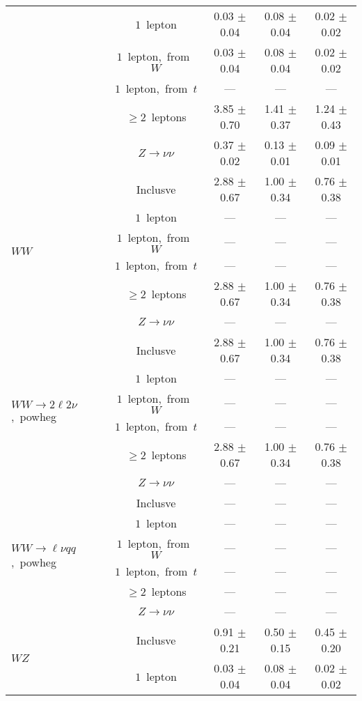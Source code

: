 \documentclass{article}
\begin{document}
\begin{longtable}{|l|c|c|c|c|}
 & $1$~lepton  & 0.03 $\pm$ 0.04  & 0.08 $\pm$ 0.04  & 0.02 $\pm$ 0.02 \\* 
 & $1$~lepton,~from~$W$  & 0.03 $\pm$ 0.04  & 0.08 $\pm$ 0.04  & 0.02 $\pm$ 0.02 \\* 
 & $1$~lepton,~from~$t$  & ---  & ---  & --- \\* 
 & $\ge2$~leptons  & 3.85 $\pm$ 0.70  & 1.41 $\pm$ 0.37  & 1.24 $\pm$ 0.43 \\* 
 & $Z\rightarrow\nu\nu$  & 0.37 $\pm$ 0.02  & 0.13 $\pm$ 0.01  & 0.09 $\pm$ 0.01 \\* 
\hline 
\multirow{6}{*}{$WW$} & Inclusve  & 2.88 $\pm$ 0.67  & 1.00 $\pm$ 0.34  & 0.76 $\pm$ 0.38 \\* 
 & $1$~lepton  & ---  & ---  & --- \\* 
 & $1$~lepton,~from~$W$  & ---  & ---  & --- \\* 
 & $1$~lepton,~from~$t$  & ---  & ---  & --- \\* 
 & $\ge2$~leptons  & 2.88 $\pm$ 0.67  & 1.00 $\pm$ 0.34  & 0.76 $\pm$ 0.38 \\* 
 & $Z\rightarrow\nu\nu$  & ---  & ---  & --- \\* 
\hline 
\multirow{6}{*}{$WW{\rightarrow}2\ell2\nu$,~powheg} & Inclusve  & 2.88 $\pm$ 0.67  & 1.00 $\pm$ 0.34  & 0.76 $\pm$ 0.38 \\* 
 & $1$~lepton  & ---  & ---  & --- \\* 
 & $1$~lepton,~from~$W$  & ---  & ---  & --- \\* 
 & $1$~lepton,~from~$t$  & ---  & ---  & --- \\* 
 & $\ge2$~leptons  & 2.88 $\pm$ 0.67  & 1.00 $\pm$ 0.34  & 0.76 $\pm$ 0.38 \\* 
 & $Z\rightarrow\nu\nu$  & ---  & ---  & --- \\* 
\hline 
\multirow{6}{*}{$WW{\rightarrow}{\ell}{\nu}qq$,~powheg} & Inclusve  & ---  & ---  & --- \\* 
 & $1$~lepton  & ---  & ---  & --- \\* 
 & $1$~lepton,~from~$W$  & ---  & ---  & --- \\* 
 & $1$~lepton,~from~$t$  & ---  & ---  & --- \\* 
 & $\ge2$~leptons  & ---  & ---  & --- \\* 
 & $Z\rightarrow\nu\nu$  & ---  & ---  & --- \\* 
\hline 
\multirow{6}{*}{$WZ$} & Inclusve  & 0.91 $\pm$ 0.21  & 0.50 $\pm$ 0.15  & 0.45 $\pm$ 0.20 \\* 
 & $1$~lepton  & 0.03 $\pm$ 0.04  & 0.08 $\pm$ 0.04  & 0.02 $\pm$ 0.02 \\* 

\end{longtable}
\end{document}
